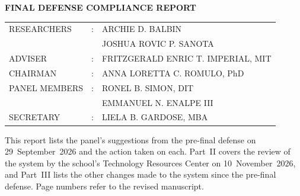 \documentclass[12pt,letterpaper]{article}
\begin{document}
\begin{center}
  {\large\bfseries FINAL DEFENSE COMPLIANCE REPORT}
\end{center}

\vspace{0.4em}

\vspace{1em}
\begin{tabular}{@{}p{3.6cm}p{0.6cm}l@{}}
RESEARCHERS   & : & ARCHIE D. BALBIN \\
              &   & JOSHUA ROVIC P. SANOTA \\[0.8em]
ADVISER       & : & FRITZGERALD ENRIC T. IMPERIAL, MIT \\[0.8em]
CHAIRMAN      & : & ANNA LORETTA C. ROMULO, PhD \\
PANEL MEMBERS & : & RONEL B. SIMON, DIT \\
              &   & EMMANUEL N. ENALPE III \\[0.8em]
SECRETARY     & : & LIELA B. GARDOSE, MBA \\
\end{tabular}

\vspace{1.2em}
\noindent This report lists the panel's suggestions from the pre-final
defense on 29~September~2026 and the action taken on each. Part~II
covers the review of the system by the school's Technology Resources
Center on 10~November~2026, and Part~III lists the other changes made to
the system since the pre-final defense. Page numbers refer to the
revised manuscript.

\vspace{1em}
\end{document}

